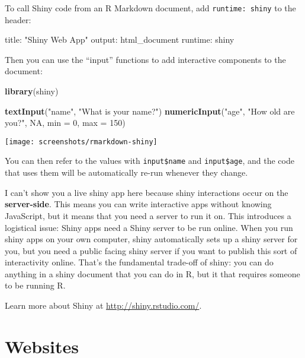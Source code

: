 \documentclass[]{book}
\newenvironment{Shaded}{\begin{snugshade}}{\end{snugshade}}
\newcommand{\KeywordTok}[1]{\textcolor[rgb]{0.13,0.29,0.53}{\textbf{{#1}}}}
\newcommand{\DataTypeTok}[1]{\textcolor[rgb]{0.13,0.29,0.53}{{#1}}}
\newcommand{\DecValTok}[1]{\textcolor[rgb]{0.00,0.00,0.81}{{#1}}}
\newcommand{\StringTok}[1]{\textcolor[rgb]{0.31,0.60,0.02}{{#1}}}
\newcommand{\OtherTok}[1]{\textcolor[rgb]{0.56,0.35,0.01}{{#1}}}
\newcommand{\FunctionTok}[1]{\textcolor[rgb]{0.00,0.00,0.00}{{#1}}}
\newcommand{\NormalTok}[1]{{#1}}
\begin{document}
To call Shiny code from an R Markdown document, add
\texttt{runtime:\ shiny} to the header:

\begin{Shaded}
\begin{Highlighting}[]
\FunctionTok{title:} \StringTok{"Shiny Web App"}
\FunctionTok{output:} \NormalTok{html_document}
\FunctionTok{runtime:} \NormalTok{shiny}
\end{Highlighting}
\end{Shaded}

Then you can use the ``input'' functions to add interactive components
to the document:

\begin{Shaded}
\begin{Highlighting}[]
\KeywordTok{library}\NormalTok{(shiny)}

\KeywordTok{textInput}\NormalTok{(}\StringTok{"name"}\NormalTok{, }\StringTok{"What is your name?"}\NormalTok{)}
\KeywordTok{numericInput}\NormalTok{(}\StringTok{"age"}\NormalTok{, }\StringTok{"How old are you?"}\NormalTok{, }\OtherTok{NA}\NormalTok{, }\DataTypeTok{min =} \DecValTok{0}\NormalTok{, }\DataTypeTok{max =} \DecValTok{150}\NormalTok{)}
\end{Highlighting}
\end{Shaded}

\begin{center}\texttt{[image: screenshots/rmarkdown-shiny]} \end{center}

You can then refer to the values with \texttt{input\$name} and
\texttt{input\$age}, and the code that uses them will be automatically
re-run whenever they change.

I can't show you a live shiny app here because shiny interactions occur
on the \textbf{server-side}. This means you can write interactive apps
without knowing JavaScript, but it means that you need a server to run
it on. This introduces a logistical issue: Shiny apps need a Shiny
server to be run online. When you run shiny apps on your own computer,
shiny automatically sets up a shiny server for you, but you need a
public facing shiny server if you want to publish this sort of
interactivity online. That's the fundamental trade-off of shiny: you can
do anything in a shiny document that you can do in R, but it that
requires someone to be running R.

Learn more about Shiny at \url{http://shiny.rstudio.com/}.

\section{Websites}\label{websites}
\end{document}
